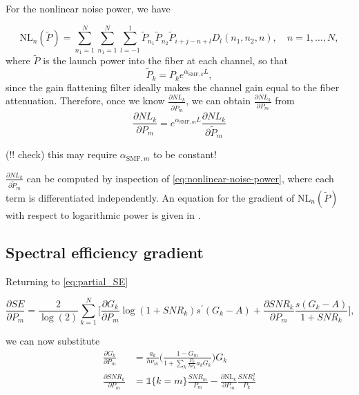 \documentclass[a4paper]{article}
\begin{document}
For the nonlinear noise power, we have

\begin{equation} \label{eq:nonlinear-noise-power}
	\mathrm{NL}_n(\tilde{P}) = \sum_{n_1 = 1}^{N}\sum_{n_1 = 1}^N\sum_{l=-1}^{1}\tilde{P}_{n_1}\tilde{P}_{n_2}\tilde{P}_{i+j-n+l}D_l(n_1, n_2, n), \quad n = 1, \ldots, N,
\end{equation}
where $\tilde{P}$ is the launch power into the fiber at each channel, so that
\begin{equation}
	\tilde{P}_k = P_ke^{\alpha_{\text{SMF}, k}L},
\end{equation}
since the gain flattening filter ideally makes the channel gain equal to the fiber attenuation. Therefore, once we know $\frac{\partial NL_k}{\partial\tilde{P}_m}$, we can obtain $\frac{\partial NL_k}{\partial P_m}$ from
\begin{equation}
	\frac{\partial NL_k}{\partial P_m} = e^{\alpha_{\text{SMF}, m}L}\frac{\partial NL_k}{\partial\tilde{P}_m}
\end{equation}

\noindent (!! check) this may require $\alpha_{\text{SMF}, m}$ to be constant!

$\frac{\partial NL_k}{\partial\tilde{P}_m}$ can be computed by inspection of \eqref{eq:nonlinear-noise-power}, where each term is differentiated independently. An equation for the gradient of $\mathrm{NL}_n(\tilde{P})$ with respect to logarithmic power is given in \cite[Appendix]{Roberts2016}. 

\subsection{Spectral efficiency gradient}

Returning to \eqref{eq:partial_SE}

\begin{equation}
\frac{\partial SE}{\partial P_m} = \frac{2}{\log(2)}\sum_{k = 1}^N \bigg [
\frac{\partial G_k}{\partial P_m} \log(1 + SNR_k) s^{\prime}(G_k - A) + \frac{\partial SNR_k}{\partial P_m}\frac{ s(G_k - A)}{1 + SNR_k}
\bigg],
\end{equation}
 
we can now substitute
\begin{align}
	\frac{\partial G_k}{\partial P_m} &= \frac{a_k}{h\nu_m}\Bigg(\frac{1 - G_m}{1 + \sum_k\frac{P_k}{h\nu_k}a_kG_k }\Bigg)G_k \\
	\frac{\partial SNR_k}{\partial P_m} &= \mathds{1}\{k= m\}\frac{SNR_m}{P_m} - \frac{\partial \mathrm{NL}_k}{\partial P_m}\frac{SNR_k^2}{P_k}
\end{align}
\end{document}
